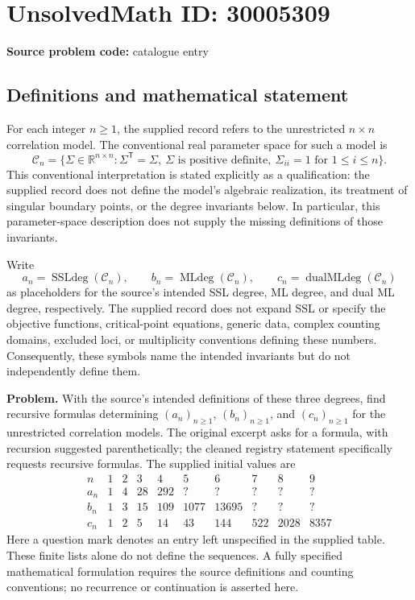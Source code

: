 \documentclass[11pt]{article}
\newcommand{\R}{\mathbb{R}}
\begin{document}
\section*{UnsolvedMath ID: 30005309}
\textbf{Source problem code:} catalogue entry
\subsection{Definitions and mathematical statement}
For each integer \(n\geq 1\), the supplied record refers to the unrestricted \(n\times n\) correlation model. The conventional real parameter space for such a model is
\[
\mathcal C_n=\{\Sigma\in\R^{n\times n}:\Sigma^{\mathsf T}=\Sigma,\ \Sigma\text{ is positive definite},\ \Sigma_{ii}=1\text{ for }1\leq i\leq n\}.
\]
This conventional interpretation is stated explicitly as a qualification: the supplied record does not define the model's algebraic realization, its treatment of singular boundary points, or the degree invariants below. In particular, this parameter-space description does not supply the missing definitions of those invariants.

Write
\[
a_n=\operatorname{SSLdeg}(\mathcal C_n),\qquad
b_n=\operatorname{MLdeg}(\mathcal C_n),\qquad
c_n=\operatorname{dualMLdeg}(\mathcal C_n)
\]
as placeholders for the source's intended SSL degree, ML degree, and dual ML degree, respectively. The supplied record does not expand SSL or specify the objective functions, critical-point equations, generic data, complex counting domains, excluded loci, or multiplicity conventions defining these numbers. Consequently, these symbols name the intended invariants but do not independently define them.

\textbf{Problem.} With the source's intended definitions of these three degrees, find recursive formulas determining \((a_n)_{n\geq1}\), \((b_n)_{n\geq1}\), and \((c_n)_{n\geq1}\) for the unrestricted correlation models. The original excerpt asks for a formula, with recursion suggested parenthetically; the cleaned registry statement specifically requests recursive formulas. The supplied initial values are
\[
\begin{array}{c|rrrrrrrrr}
n&1&2&3&4&5&6&7&8&9\\\hline
 a_n&1&4&28&292&?&?&?&?&?\\
 b_n&1&3&15&109&1077&13695&?&?&?\\
 c_n&1&2&5&14&43&144&522&2028&8357
\end{array}
\]
Here a question mark denotes an entry left unspecified in the supplied table. These finite lists alone do not define the sequences. A fully specified mathematical formulation requires the source definitions and counting conventions; no recurrence or continuation is asserted here.
\end{document}
